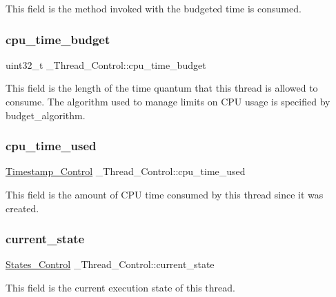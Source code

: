 This field is the method invoked with the budgeted time is consumed. \mbox{\label{struct__Thread__Control_a41df13f59c5389c807a3eed5013018b4}} 
\subsubsection{\texorpdfstring{cpu\_time\_budget}{cpu\_time\_budget}}
{\footnotesize\ttfamily uint32\+\_\+t \+\_\+\+Thread\+\_\+\+Control\+::cpu\+\_\+time\+\_\+budget}

This field is the length of the time quantum that this thread is allowed to consume. The algorithm used to manage limits on C\+PU usage is specified by budget\+\_\+algorithm. \mbox{\label{struct__Thread__Control_a25fc66922c3cc7f7d9e440c54d461a5a}} 
\subsubsection{\texorpdfstring{cpu\_time\_used}{cpu\_time\_used}}
{\footnotesize\ttfamily \mbox{\hyperlink{group__SuperCoreTimeStamp_ga8508036506d5211c98844c88045e2410}{Timestamp\+\_\+\+Control}} \+\_\+\+Thread\+\_\+\+Control\+::cpu\+\_\+time\+\_\+used}

This field is the amount of C\+PU time consumed by this thread since it was created. \mbox{\label{struct__Thread__Control_a537008b7050b384664cfb5b2b407facf}} 
\subsubsection{\texorpdfstring{current\_state}{current\_state}}
{\footnotesize\ttfamily \mbox{\hyperlink{group__RTEMSScoreStates_gaeebbea0bfca162709b124fd519cf99d3}{States\+\_\+\+Control}} \+\_\+\+Thread\+\_\+\+Control\+::current\+\_\+state}

This field is the current execution state of this thread. \mbox{\label{struct__Thread__Control_ada69103bd5a31290709bde9d9c5aeff8}} 
